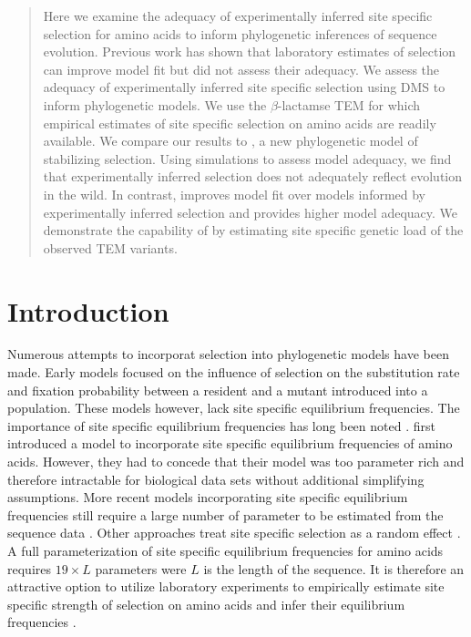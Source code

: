 \documentclass[12pt]{article}
\begin{document}
\begin{abstract}
Here we examine the adequacy of experimentally inferred site specific selection for amino acids to inform phylogenetic inferences of sequence evolution.
Previous work has shown that laboratory estimates of selection can improve model fit but did not assess their adequacy.
We assess the adequacy of experimentally inferred site specific selection using DMS to inform phylogenetic models.
We use the $\beta$-lactamse TEM for which empirical estimates of site specific selection on amino acids are readily available.
We compare our results to \selac, a new phylogenetic model of stabilizing selection.
Using simulations to assess model adequacy, we find that experimentally inferred selection does not adequately reflect evolution in the wild.
In contrast, \selac improves model fit over models informed by experimentally inferred selection and provides higher model adequacy.
We demonstrate the capability of \selac by estimating site specific genetic load of the observed TEM variants.

\end{abstract}
\newpage

\section*{Introduction}

Numerous attempts to incorporat selection into phylogenetic models have been made.
Early models focused on the influence of selection on the substitution rate and fixation probability between a resident and a mutant introduced into a population\citep{GoldmanAndYang1994, MuseAndGaut1994, thorne1996}.
These models however, lack site specific equilibrium frequencies.
The importance of site specific equilibrium frequencies has long been noted \citep{felsenstein1981, gojobori1983}.
\citet{HalpernAndBruno1998} first introduced a model to incorporate site specific equilibrium frequencies of amino acids.
However, they had to concede that their model was too parameter rich and therefore intractable for biological data sets without additional simplifying assumptions.
More recent models incorporating site specific equilibrium frequencies still require a large number of parameter to be estimated from the sequence data \citep{LartillotAndPhilippe2004,le2008,wang2008,holder2008,wu2013,tamuri2014}.
Other approaches treat site specific selection as a random effect \citep{rodrigue2010,rodrigue2013,rodrigue2014}.
A full parameterization of site specific equilibrium frequencies for amino acids requires $19\times L$ parameters were $L$ is the length of the sequence.
It is therefore an attractive option to utilize laboratory experiments to empirically estimate site specific strength of selection on amino acids and infer their equilibrium frequencies \citep{bloom2014, thyagarajan2014, bloom2017}.
\end{document}
